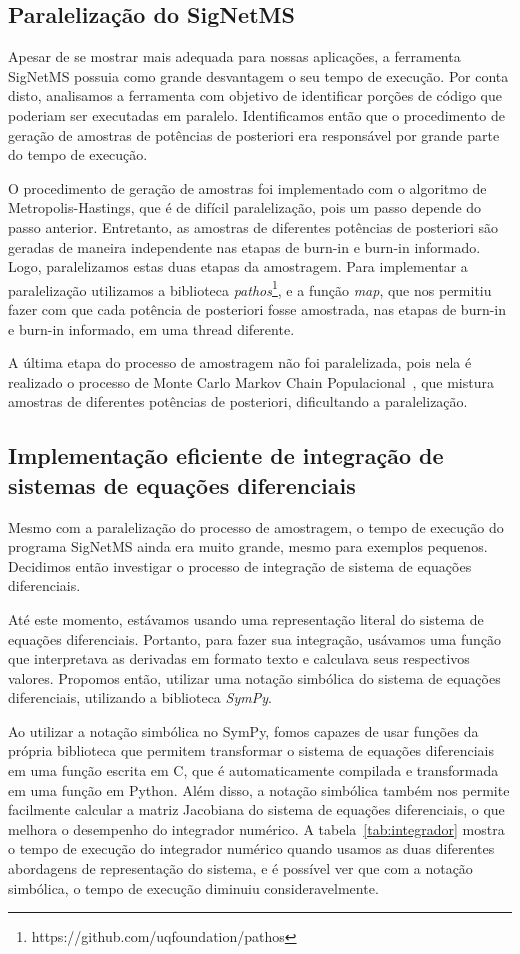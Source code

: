 \documentclass[12pt]{article}
\newcommand{\toolname}[1]{\textit{#1}}
\begin{document}
\subsection{Paralelização do SigNetMS}
Apesar de se mostrar mais adequada para nossas aplicações, a ferramenta
SigNetMS possuia como grande desvantagem o seu tempo de execução. Por
conta disto, analisamos a ferramenta com objetivo de identificar porções 
de código que poderiam ser executadas em paralelo. Identificamos então
que o procedimento de geração de amostras de potências de posteriori era 
responsável por grande parte do tempo de execução.

O procedimento de geração de amostras foi implementado com o algoritmo
de Metropolis-Hastings, que é de difícil paralelização, pois um passo
depende do passo anterior. Entretanto, as amostras de diferentes
potências de posteriori são geradas de maneira independente nas etapas
de burn-in e burn-in informado. Logo, paralelizamos estas duas etapas da
amostragem. Para implementar a paralelização utilizamos a biblioteca
\toolname{pathos}\footnote{https://github.com/uqfoundation/pathos},
e a função \toolname{map}, que nos permitiu fazer com que cada potência
de posteriori fosse amostrada, nas etapas de burn-in e burn-in
informado, em uma thread diferente.

A última etapa do processo de amostragem não foi paralelizada, pois nela
é realizado o processo de Monte Carlo Markov Chain
Populacional~\cite{Friel2008}, que mistura amostras de diferentes
potências de posteriori, dificultando a paralelização.

\subsection{Implementação eficiente de integração de sistemas de
equações diferenciais}
Mesmo com a paralelização do processo de amostragem, o tempo de execução
do programa SigNetMS ainda era muito grande, mesmo para exemplos
pequenos. Decidimos então investigar o processo de integração de sistema
de equações diferenciais.

Até este momento, estávamos usando uma representação literal do sistema
de equações diferenciais. Portanto, para fazer sua integração, usávamos
uma função que interpretava as derivadas em formato texto e calculava 
seus respectivos valores. Propomos então, utilizar uma notação simbólica 
do sistema de equações diferenciais, utilizando a biblioteca 
\toolname{SymPy}. 

Ao utilizar a notação simbólica no SymPy, fomos capazes de usar funções
da própria biblioteca que permitem transformar o sistema de equações
diferenciais em uma função escrita em C, que é automaticamente compilada
e transformada em uma função em Python. Além disso, a notação simbólica
também nos permite facilmente calcular a matriz Jacobiana do sistema de
equações diferenciais, o que melhora o desempenho do integrador
numérico. A tabela~\ref{tab:integrador} mostra o tempo de execução do
integrador numérico quando usamos as duas diferentes abordagens de
representação do sistema, e é possível ver que com a notação simbólica,
o tempo de execução diminuiu consideravelmente.
\end{document}
